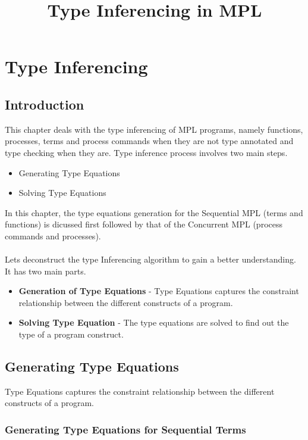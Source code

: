 \documentclass[11pt]{article}
\title{Type Inferencing in MPL}
\begin{document}
\maketitle

\section{Type Inferencing}



\subsection {Introduction}
This chapter deals with the type inferencing of MPL programs, namely functions, processes, terms and process commands when they are not type annotated and type checking when they are. Type inference process involves two main steps.
\begin {itemize}
\item Generating Type Equations 
\item Solving Type Equations ~~\\
\end{itemize}
In this chapter, the type equations generation for the Sequential MPL (terms and functions) is dicussed first followed by that of the Concurrent MPL (process commands and processes). 
~~\\~~\\
Lets deconstruct the type Inferencing algorithm to gain a better understanding. It has two main parts.
\begin {itemize}
\item {\bf Generation of Type Equations} - Type Equations captures the constraint relationship between the different constructs of
a program.
\item {\bf Solving Type Equation} - The type equations are solved to find out the type of a program construct.   
\end{itemize}

\subsection {Generating Type Equations }
 Type Equations captures the constraint relationship between the different constructs of a program.
\subsubsection {Generating Type Equations for Sequential Terms}
\end{document}
